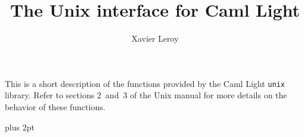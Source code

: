 
\title{The Unix interface for Caml Light}
\author{Xavier Leroy}

\def\comment{\list{}{}\item[]}
\def\endcomment{\endlist}

\def\library{
\begin{raggedright}
\def\@listI{\leftmargin\leftmargini \parsep 4.5pt plus 2pt minus 1pt%
\topsep 3pt plus 1pt minus 1pt%
\itemsep 0pt}
\topsep 2pt plus 2pt
\partopsep 0pt
}

\def\endlibrary{
\end{raggedright}}

\let\mysection=\section



\maketitle

This is a short description of the functions provided by the Caml
Light {\tt unix} library. Refer to sections 2~and~3 of the Unix manual for
more details on the behavior of these functions.

\begin{library}



\end{library}



